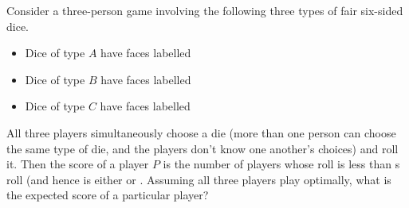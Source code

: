 Consider a three-person game involving the following three types of fair six-sided dice.
\begin{itemize}
\item Dice of type $A$ have faces labelled      
\item Dice of type $B$ have faces labelled      
\item Dice of type $C$ have faces labelled      
\end{itemize}
All three players simultaneously choose a die (more than one person can choose the same type of die, and the players don't know one another's choices) and roll it.  Then the score of a player $P$ is the number of players whose roll is less than s roll (and hence is either   or .
Assuming all three players play optimally, what is the expected score of a particular player?